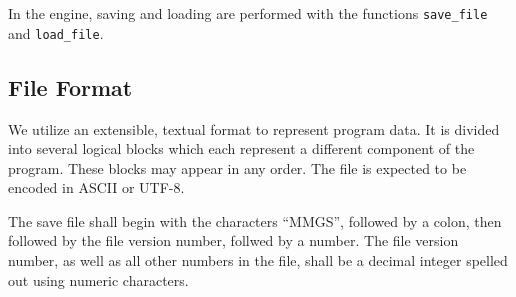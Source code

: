 \documentclass{report}
\begin{document}
In the engine, saving and loading are performed with the functions
\texttt{save_file} and \texttt{load_file}.

\subsection{File Format}
We utilize an extensible, textual format to represent program data.
It is divided into several logical blocks which each represent a different
component of the program. These blocks may appear in any order. The file
is expected to be encoded in ASCII or UTF-8.

The save file shall begin with the characters ``MMGS'', followed by a colon,
then followed by the file version number, follwed by a number. The
file version number, as well as all other numbers in the file, shall be a
decimal integer spelled out using numeric characters.
\end{document}
